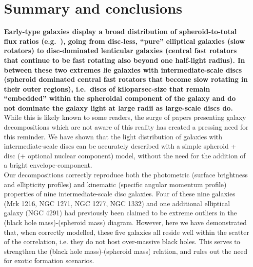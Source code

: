 \documentclass[useAMS,usenatbib,article]{mnras}
\begin{document}
\section{Summary and conclusions}
{\bf Early-type galaxies display a broad distribution of spheroid-to-total flux ratios (e.g.~\citealt{cappellari2011kmdr}), 
going from disc-less, ``pure'' elliptical galaxies (slow rotators) 
to disc-dominated lenticular galaxies (central fast rotators that continue to be fast rotating also beyond one half-light radius). 
In between these two extremes lie galaxies with intermediate-scale discs 
(spheroid dominated central fast rotators that become slow rotating in their outer regions), 
i.e.~discs of kiloparsec-size that remain ``embedded'' within the spheroidal component of the galaxy 
and do not dominate the galaxy light at large radii as large-scale discs do. }
While this is likely known to some readers, 
the surge of papers presenting galaxy decompositions which are not aware of this reality 
has created a pressing need for this reminder. 
We have shown that the light distribution of galaxies with intermediate-scale discs can be accurately described 
with a simple spheroid + disc (+ optional nuclear component) model, 
without the need for the addition of a bright envelope-component. \\
Our decompositions correctly reproduce both the photometric (surface brightness and ellipticity profiles) 
and kinematic (specific angular momentum profile) properties of nine intermediate-scale disc galaxies. 
Four of these nine galaxies (Mrk 1216, NGC 1271, NGC 1277, NGC 1332) and one additional elliptical galaxy (NGC 4291) 
had previously been claimed to be extreme outliers in the (black hole mass)-(spheroid mass) diagram. 
However, here we have demonstrated that, when correctly modelled, 
these five galaxies all reside well within the scatter of the correlation, 
i.e. they do not host over-massive black holes. 
This serves to strengthen the (black hole mass)-(spheroid mass) relation, 
and rules out the need for exotic formation scenarios. 
\end{document}
